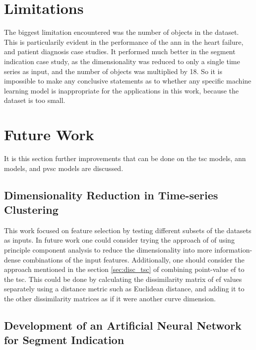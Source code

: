\section{Limitations}

The biggest limitation encountered was the number of objects in the dataset. This is particularily evident in the performance of the \acrshort{ann} in the heart failure, and patient diagnosis case studies. It performed much better in the segment indication case study, as the dimensionality was reduced to only a single time series as input, and the number of objects was multiplied by 18. So it is impossible to make any conclusive statements as to whether any specific machine learning model is inappropriate for the applications in this work, because the dataset is too small. 

\section{Future Work}

It is this section further improvements that can be done on the \acrshort{tsc} models, \acrshort{ann} models, and \acrshort{pvsc} models are discussed. 

\subsection*{Dimensionality Reduction in Time-series Clustering}

This work focused on feature selection by testing different subsets of the datasets as inputs. In future work one could consider trying the approach of \cite{hf_diagnosis_ml} of using principle component analysis to reduce the dimensionality into more information-dense combinations of the input features. Additionally, one should consider the approach mentioned in the section \ref{sec:disc_tsc} of combining point-value \acrshort{ef} to the \acrshort{tsc}. This could be done by calculating the dissimilarity matrix of \acrshort{ef} values separately using a distance metric such as Euclidean distance, and adding it to the other dissimilarity matrices as if it were another curve dimension.

\subsection*{Development of an Artificial Neural Network for Segment Indication}

